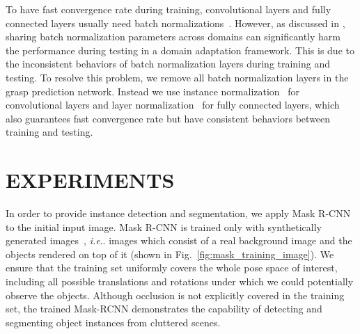 \documentclass[letterpaper, 10 pt, conference]{ieeeconf}  %
\makeatletter
\DeclareRobustCommand\onedot{\futurelet\@let@token\@onedot}
\def\@onedot{\ifx\@let@token.\else.\null\fi\xspace}
\def\ie{\emph{i.e}\onedot} \def\Ie{\emph{I.e}\onedot}
\makeatother
\begin{document}
To have fast convergence rate during training, convolutional layers and fully connected layers usually need batch normalizations~\cite{ioffe2015batch}. However, as discussed in \cite{bousmalis-2018}, sharing batch normalization parameters across domains can significantly harm the performance during testing in a domain adaptation framework. This is due to the inconsistent behaviors of batch normalization layers during training and testing. To resolve this problem, we remove all batch normalization layers in the grasp prediction network. Instead we use instance normalization~\cite{ulyanov2016instance} for convolutional layers and layer normalization~\cite{Ba2016LayerN} for fully connected layers, which also guarantees fast convergence rate but have consistent behaviors between training and testing.

\section{EXPERIMENTS}%
In order to provide instance detection and segmentation, we apply Mask R-CNN~\cite{he2017mask} to the initial input image.
Mask R-CNN is trained only with synthetically generated images~\cite{hinterstoisser2017pre}, \ie images which
consist of a real background image and the objects rendered on top of it (shown in Fig.~\ref{fig:mask_training_image}). We ensure that the training set uniformly
covers the whole pose space of interest, including all possible translations and rotations under which we could potentially observe the objects.
Although occlusion is not explicitly covered in the training set, the trained Mask-RCNN demonstrates the capability of detecting and segmenting object instances from cluttered scenes.
\end{document}

